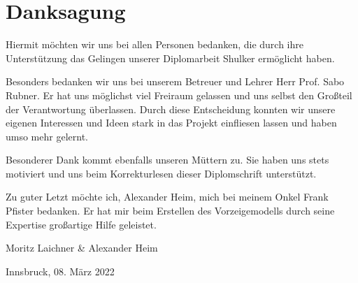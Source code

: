 \section*{Danksagung}

Hiermit möchten wir uns bei allen Personen bedanken, die durch ihre Unterstützung das Gelingen unserer Diplomarbeit Shulker ermöglicht haben.

Besonders bedanken wir uns bei unserem Betreuer und Lehrer Herr Prof. Sabo Rubner. Er hat uns möglichst viel
Freiraum gelassen und uns selbst den Großteil der Verantwortung überlassen. Durch diese Entscheidung konnten
wir unsere eigenen Interessen und Ideen stark in das Projekt einfliesen lassen und haben umso mehr gelernt.

Besonderer Dank kommt ebenfalls unseren Müttern zu. Sie haben uns stets motiviert und uns beim Korrekturlesen dieser Diplomschrift
unterstützt.

Zu guter Letzt möchte ich, Alexander Heim, mich bei meinem Onkel Frank Pfister bedanken. Er hat mir beim
Erstellen des Vorzeigemodells durch seine Expertise großartige Hilfe geleistet.

\vspace{1cm}

Moritz Laichner \& Alexander Heim

Innsbruck, 08. März 2022

\newpage